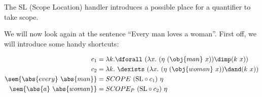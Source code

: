 The $\mathrm{SL}$ (Scope Location) handler introduces a possible place for
a quantifier to take scope.

We will now look again at the sentence ``Every man loves a woman''. First
off, we will introduce some handy shortcuts:

\begin{align*}
c_1 &= \lambda k. \dforall\ (\lambda x.\ (\eta\ (\obj{man}\ x)) \dimp (k\ x)) \\
c_2 &= \lambda k.\ \dexists\ (\lambda x.\ (\eta\ (\obj{woman}\ x)) \dand
(k\ x)) \\
\sem{\abs{every}\ \abs{man}} &= SCOPE\ (\mathrm{SL} \circ c_1)\ \eta \\
\sem{\abs{a}\ \abs{woman}} &= SCOPE_P\ (\mathrm{SL} \circ c_2)\ \eta
\end{align*}


